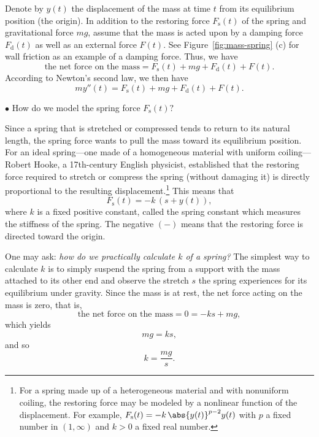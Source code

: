 Denote by \(y(t)\) the displacement of the mass at time \(t\) from its equilibrium position (the origin). 
In addition to the restoring force \(F_{\text{s}}(t)\) of the spring and gravitational force $mg$, assume that the mass is acted upon by a damping force \(F_{\text{d}}(t)\) as well as an external force \(F(t).\) See  Figure~\ref{fig:mass-spring} (c) for wall friction as an example of a damping force.  Thus, we have
\[
\text{the net force on the mass} = F_{\text{s}}(t) +mg+  F_{\text{d}}(t) + F(t).
\]
According to Newton’s second law, we then have
\begin{equation}\label{eq:mass-spring1}
m y''(t) = F_{\text{s}}(t) + mg+ F_{\text{d}}(t) + F(t).
\end{equation}


 \noindent$\bullet$ How do we model the spring force $F_{\text{s}}(t)?$  
 
 Since a spring that is stretched or compressed tends to return to its natural length, the spring force  wants to pull the mass toward its equilibrium position. For an ideal spring—one made of a homogeneous material with uniform coiling—Robert Hooke, a 17th-century English physicist, established that the restoring force required to stretch or compress the spring (without damaging it) is directly proportional to the resulting displacement.\footnote[1]{ For a spring made up of a heterogeneous material and with nonuniform coiling, the restoring force may be modeled by a nonlinear function of  the displacement. For example, \( F_{\text{s}}(t) = - k\,\abs{y(t)}^{p-2}y(t)\) with $p$ a fixed number in \((1, \infty)\) and $k>0$  a fixed real number.} 
This means that 
\begin{equation}\label{eq:mass-spring2}
	 F_{\text{s}}(t) = - k\,(s+y(t)),
	 \end{equation}
where $k$ is a fixed positive constant, called the spring constant which measures the stiffness of the spring. The negative $(-)$ means that the restoring force is directed toward the origin. 

One may ask:  {\textit{how do we practically calculate $k$ of a spring?}} The simplest way to calculate $k$ is to simply suspend the spring from a support with the mass attached to its other end and observe the stretch $s$ the spring experiences for its equilibrium under gravity. Since the mass is at rest, the net force acting on the mass is zero, that is, 
\[\text{the net force on the mass}=0 = - ks +mg,\] which yields
\begin{equation}\label{eq:mass-spring3}
	mg = ks,
	\end{equation} and so
\[k = \frac{mg}{s}.\] 

